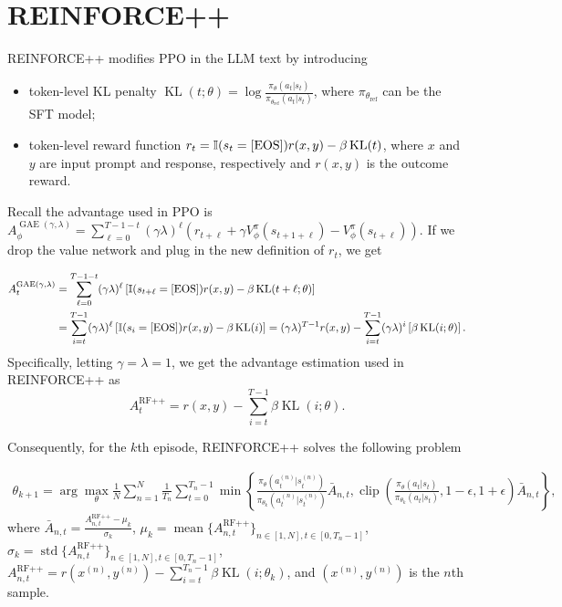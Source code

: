 \section{REINFORCE++}



REINFORCE++ modifies PPO in the LLM text by introducing
\begin{itemize}
    \item token-level KL penalty  $\operatorname{KL}(t;\theta)=\log\frac{\pi_{\theta}(a_t|s_t)}{\pi_{\theta_{\text{ref}}}(a_t|s_t)}$, where $\pi_{\theta_{\text{ref}}}$ can be the SFT model;
    \item token-level reward function $r_t=\mathbb{I}(s_t=[\text{EOS}])r(x,y)-\beta\operatorname{KL}(t)$, where $x$ and $y$ are input prompt and response, respectively and $r(x,y)$ is the outcome reward.
\end{itemize}

Recall the advantage used in PPO is $A^{\operatorname{GAE}(\gamma, \lambda)}_{\phi} = \sum_{\ell=0}^{T-1-t}(\gamma\lambda)^{\ell}\left(r_{t+\ell} + \gamma V^{\pi}_{\phi}(s_{t+1+\ell}) - V^{\pi}_{\phi}(s_{t+\ell}) \right)$. If we drop the value network and plug in the new definition of $r_t$, we get 

\begin{align*}
    A^{\operatorname{GAE}(\gamma, \lambda)}_{t} 
    & = \sum_{\ell=0}^{T-1-t}(\gamma\lambda)^{\ell}\left[\mathbb{I}(s_{t+\ell}=[\text{EOS}])r(x,y)-\beta\operatorname{KL}(t+\ell;\theta) \right] \\
    & = \sum_{i=t}^{T-1}(\gamma\lambda)^{\ell}\left[\mathbb{I}(s_{i}=[\text{EOS}])r(x,y)-\beta\operatorname{KL}(i) \right]  = (\gamma\lambda)^{T-1}r(x,y)-\sum_{i=t}^{T-1}(\gamma\lambda)^{i}\left[\beta\operatorname{KL}(i;\theta) \right].
\end{align*}
Specifically, letting $\gamma=\lambda=1$, we get the advantage estimation used in REINFORCE++ as
\begin{equation}
A^{\operatorname{RF++}}_{t}=r(x,y) - \sum_{i=t}^{T-1}\beta\operatorname{KL}(i;\theta). 
\end{equation}


Consequently, for the $k$th episode, REINFORCE++ solves the following problem

\begin{align*}
     \theta_{k+1}=\arg\max_{\theta} \frac{1}{N}\sum_{n=1}^{N}\frac{1}{T_n}
      \sum_{t=0}^{T_n-1}  
     \min\left\{\frac{\pi_{\theta}(a_t^{(n)}|s_t^{(n)})}{\pi_{\theta_{k}}(a_t^{(n)}|s_t^{(n)})}\bar A_{n,t}, \operatorname{clip}\left(\frac{\pi_{\theta}(a_t|s_t)}{\pi_{\theta_{k}}(a_t|s_t)}, 1-\epsilon, 1+\epsilon\right)
     \bar A_{n,t}\right\},
\end{align*}
where $\bar A_{n,t} = \frac{A^{\operatorname{RF++}}_{n,t}-\mu_k}{\sigma_k}$, $\mu_k=\operatorname{mean}\{A^{\operatorname{RF++}}_{n,t}\}_{n\in[1,N], t\in[0,T_n-1]}$, $\sigma_k=\operatorname{std}\{A^{\operatorname{RF++}}_{n,t}\}_{n\in[1,N], t\in[0,T_n-1]}$, $A^{\operatorname{RF++}}_{n,t}=r(x^{(n)},y^{(n)}) - \sum_{i=t}^{T_n-1}\beta\operatorname{KL}(i;\theta_k)$, and $(x^{(n)},y^{(n)})$ is the $n$th sample.


